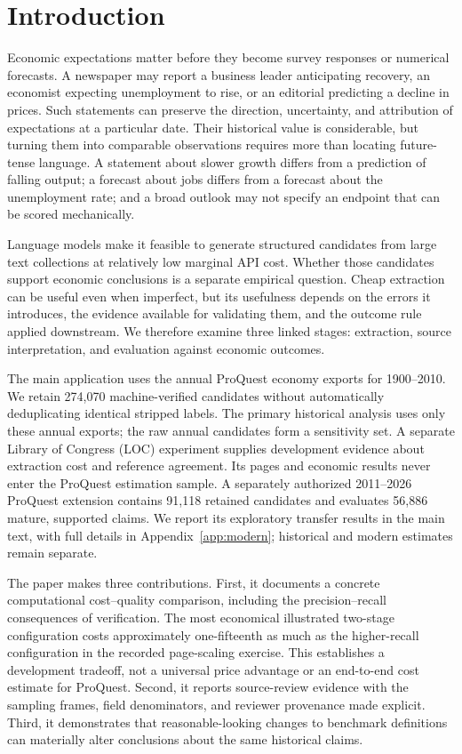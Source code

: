 \section{Introduction}
Economic expectations matter before they become survey responses or numerical forecasts. A newspaper may report a business leader anticipating recovery, an economist expecting unemployment to rise, or an editorial predicting a decline in prices. Such statements can preserve the direction, uncertainty, and attribution of expectations at a particular date. Their historical value is considerable, but turning them into comparable observations requires more than locating future-tense language. A statement about slower growth differs from a prediction of falling output; a forecast about jobs differs from a forecast about the unemployment rate; and a broad outlook may not specify an endpoint that can be scored mechanically.

Language models make it feasible to generate structured candidates from large text collections at relatively low marginal API cost. Whether those candidates support economic conclusions is a separate empirical question. Cheap extraction can be useful even when imperfect, but its usefulness depends on the errors it introduces, the evidence available for validating them, and the outcome rule applied downstream. We therefore examine three linked stages: extraction, source interpretation, and evaluation against economic outcomes.

The main application uses the annual ProQuest economy exports for 1900--2010. We retain 274,070 machine-verified candidates without automatically deduplicating identical stripped labels. The primary historical analysis uses only these annual exports; the raw annual candidates form a sensitivity set. A separate Library of Congress (LOC) experiment supplies development evidence about extraction cost and reference agreement. Its pages and economic results never enter the ProQuest estimation sample. A separately authorized 2011--2026 ProQuest extension contains 91,118 retained candidates and evaluates 56,886 mature, supported claims. We report its exploratory transfer results in the main text, with full details in Appendix~\ref{app:modern}; historical and modern estimates remain separate.

The paper makes three contributions. First, it documents a concrete computational cost--quality comparison, including the precision--recall consequences of verification. The most economical illustrated two-stage configuration costs approximately one-fifteenth as much as the higher-recall configuration in the recorded page-scaling exercise. This establishes a development tradeoff, not a universal price advantage or an end-to-end cost estimate for ProQuest. Second, it reports source-review evidence with the sampling frames, field denominators, and reviewer provenance made explicit. Third, it demonstrates that reasonable-looking changes to benchmark definitions can materially alter conclusions about the same historical claims.

